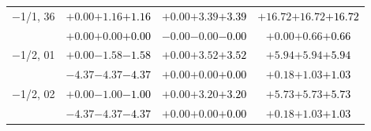 \documentclass[compress]{beamer}
\begin{document}
\begin{frame}
\begin{tabular}{r | c | c | c}
$-$1/1, 36 & $+0.00$\hspace{0.1 cm}$+1.16$\hspace{0.1 cm}\textcolor{black}{$+1.16$} & $+0.00$\hspace{0.1 cm}$+3.39$\hspace{0.1 cm}\textcolor{black}{$+3.39$} & $+16.72$\hspace{0.1 cm}$+16.72$\hspace{0.1 cm}\textcolor{black}{$+16.72$} \\
           & $+0.00$\hspace{0.1 cm}$+0.00$\hspace{0.1 cm}\textcolor{black}{$+0.00$} & $-0.00$\hspace{0.1 cm}$-0.00$\hspace{0.1 cm}\textcolor{black}{$-0.00$} & $+0.00$\hspace{0.1 cm}$+0.66$\hspace{0.1 cm}\textcolor{black}{$+0.66$} \\
$-$1/2, 01 & $+0.00$\hspace{0.1 cm}$-1.58$\hspace{0.1 cm}\textcolor{black}{$-1.58$} & $+0.00$\hspace{0.1 cm}$+3.52$\hspace{0.1 cm}\textcolor{black}{$+3.52$} & $+5.94$\hspace{0.1 cm}$+5.94$\hspace{0.1 cm}\textcolor{black}{$+5.94$} \\
           & $-4.37$\hspace{0.1 cm}$-4.37$\hspace{0.1 cm}\textcolor{black}{$-4.37$} & $+0.00$\hspace{0.1 cm}$+0.00$\hspace{0.1 cm}\textcolor{black}{$+0.00$} & $+0.18$\hspace{0.1 cm}$+1.03$\hspace{0.1 cm}\textcolor{black}{$+1.03$} \\
$-$1/2, 02 & $+0.00$\hspace{0.1 cm}$-1.00$\hspace{0.1 cm}\textcolor{black}{$-1.00$} & $+0.00$\hspace{0.1 cm}$+3.20$\hspace{0.1 cm}\textcolor{black}{$+3.20$} & $+5.73$\hspace{0.1 cm}$+5.73$\hspace{0.1 cm}\textcolor{black}{$+5.73$} \\
           & $-4.37$\hspace{0.1 cm}$-4.37$\hspace{0.1 cm}\textcolor{black}{$-4.37$} & $+0.00$\hspace{0.1 cm}$+0.00$\hspace{0.1 cm}\textcolor{black}{$+0.00$} & $+0.18$\hspace{0.1 cm}$+1.03$\hspace{0.1 cm}\textcolor{black}{$+1.03$} \\

\end{tabular}
\end{frame}
\end{document}
